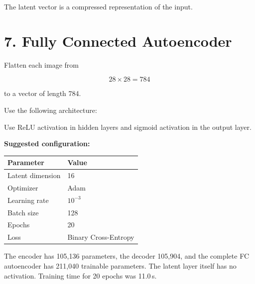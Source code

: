 \documentclass[10pt]{article}
\begin{document}
The latent vector is a compressed representation of the input.

\section*{7. Fully Connected Autoencoder}

Flatten each image from

\[
28\times28=784
\]

to a vector of length 784.

Use the following architecture:

\begin{center}
\end{center}

Use ReLU activation in hidden layers and sigmoid activation in the output
layer.

\textbf{Suggested configuration:}

\begin{center}
\begin{tabular}{|l|l|}
\hline
Parameter & Value\\
\hline
Latent dimension & 16\\
Optimizer & Adam\\
Learning rate & $10^{-3}$\\
Batch size & 128\\
Epochs & 20\\
Loss & Binary Cross-Entropy\\
\hline
\end{tabular}
\end{center}

The encoder has 105,136 parameters, the decoder 105,904, and the complete
FC autoencoder has 211,040 trainable parameters. The latent layer itself has no
activation. Training time for 20 epochs was 11.0\,s.
\end{document}
